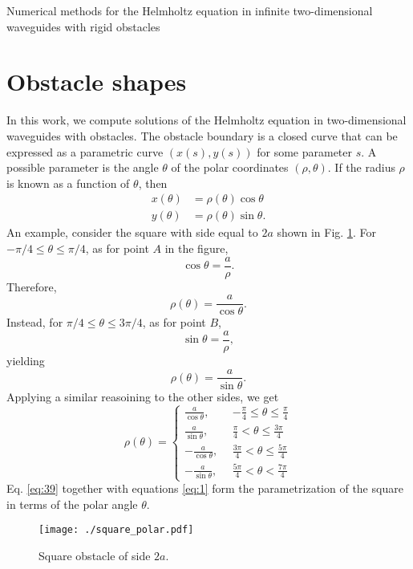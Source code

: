 \documentclass[11pt]{article}
\begin{document}
\begin{center}
{\Large Numerical methods for the Helmholtz equation in infinite two-dimensional waveguides with rigid obstacles}
\end{center}
\section{Obstacle shapes}
In this work, we compute solutions of the Helmholtz equation in two-dimensional waveguides with obstacles. The obstacle boundary is a closed curve that can be expressed as a parametric curve $(x(s),y(s))$ for some parameter $s$. A possible parameter is the angle $\theta$ of the polar coordinates $(\rho, \theta)$. If the radius $\rho$ is known as a function of $\theta$, then
\begin{subequations}
  \label{eq:1}
  \begin{align}
    x(\theta) &= \rho(\theta)\cos\theta \\
    y(\theta) &= \rho(\theta)\sin\theta.
  \end{align}
\end{subequations}
An example, consider the square with side equal to $2a$ shown in Fig. \ref{fig:square_polar}. For $-\pi/4 \le \theta \le \pi/4$, as for point $A$ in the figure,
\begin{equation}
  \label{eq:37}
  \cos\theta = \frac{a}{\rho}.
\end{equation}
Therefore,
\begin{equation}
  \label{eq:30}
  \rho(\theta) = \frac{a}{\cos\theta}.
\end{equation}
Instead, for $\pi/4 \le \theta \le 3\pi/4$, as for point $B$,
\begin{equation}
  \label{eq:36}
    \sin\theta = \frac{a}{\rho},
  \end{equation}
  yielding
  \begin{equation}
    \label{eq:38}
  \rho(\theta) = \frac{a}{\sin\theta}.    
  \end{equation}
  Applying a similar reasoining to the other sides, we get
  \begin{equation}
    \label{eq:39}
    \rho(\theta) =
    \begin{cases}
      \frac{a}{\cos\theta},~~&-\frac{\pi}{4} \le \theta \le \frac{\pi}{4}  \\
      \frac{a}{\sin\theta},~~&\frac{\pi}{4} < \theta \le \frac{3\pi}{4} \\
      -\frac{a}{\cos\theta},~~&\frac{3\pi}{4} < \theta \le \frac{5\pi}{4}  \\
      -\frac{a}{\sin\theta},~~&\frac{5\pi}{4} < \theta < \frac{7\pi}{4} 
    \end{cases}
  \end{equation}
Eq. \eqref{eq:39} together with equations \eqref{eq:1} form the parametrization of the square in terms of the polar angle $\theta$.
\begin{figure}[h]
  \centering
  \texttt{[image: ./square\_polar.pdf]}
  \caption{Square obstacle of side $2a$.}
  \label{fig:square_polar}
\end{figure}
\end{document}
